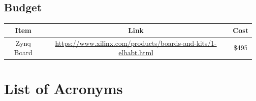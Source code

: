 \documentclass[11pt, oneside]{article}      %
\begin{document}
\subsection{Budget}
\begin{center}
\begin{tabular}{ |c|c|c|}
    \hline
    \textbf{Item}           & \textbf{Link}                                                     & \textbf{Cost} \\
    \hline
    Zynq Board              & \href{https://www.xilinx.com/products/boards-and-kits/1-elhabt.html}{https://www.xilinx.com/products/boards-and-kits/1-elhabt.html}     & \$495 \\
    \hline
\end{tabular}
\end{center}

\section{List of Acronyms}



\clearpage



\end{document}
